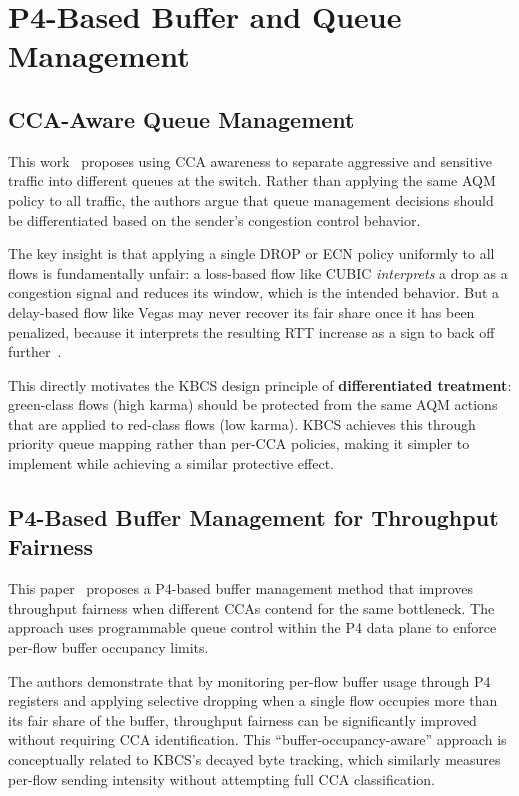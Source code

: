 \documentclass[12pt,a4paper]{report}
\begin{document}
\section{P4-Based Buffer and Queue Management}

\subsection{CCA-Aware Queue Management}
This work~\cite{ccaaware} proposes using CCA awareness to separate aggressive and sensitive traffic into different queues at the switch. Rather than applying the same AQM policy to all traffic, the authors argue that queue management decisions should be differentiated based on the sender's congestion control behavior.

The key insight is that applying a single DROP or ECN policy uniformly to all flows is fundamentally unfair: a loss-based flow like CUBIC \textit{interprets} a drop as a congestion signal and reduces its window, which is the intended behavior. But a delay-based flow like Vegas may never recover its fair share once it has been penalized, because it interprets the resulting RTT increase as a sign to back off further~\cite{ccaaware}.

This directly motivates the KBCS design principle of \textbf{differentiated treatment}: green-class flows (high karma) should be protected from the same AQM actions that are applied to red-class flows (low karma). KBCS achieves this through priority queue mapping rather than per-CCA policies, making it simpler to implement while achieving a similar protective effect.

\subsection{P4-Based Buffer Management for Throughput Fairness}
This paper~\cite{buffermgmt} proposes a P4-based buffer management method that improves throughput fairness when different CCAs contend for the same bottleneck. The approach uses programmable queue control within the P4 data plane to enforce per-flow buffer occupancy limits.

The authors demonstrate that by monitoring per-flow buffer usage through P4 registers and applying selective dropping when a single flow occupies more than its fair share of the buffer, throughput fairness can be significantly improved without requiring CCA identification. This ``buffer-occupancy-aware'' approach is conceptually related to KBCS's decayed byte tracking, which similarly measures per-flow sending intensity without attempting full CCA classification.
\end{document}

